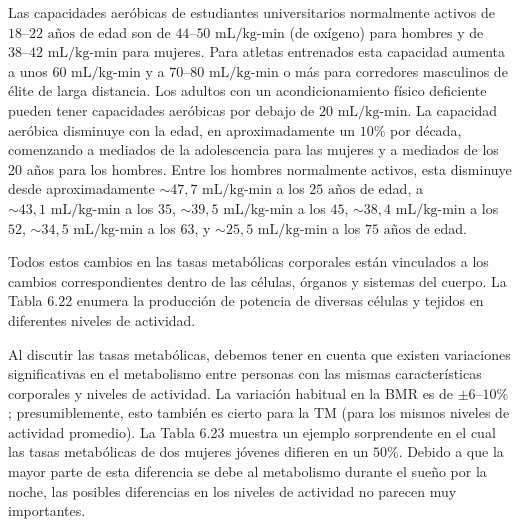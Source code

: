 \documentclass[12pt]{book}
\begin{document}
Las capacidades aeróbicas de estudiantes universitarios normalmente activos de $18\text{--}22\text{ años}$ de edad son de $44\text{--}50\text{ mL/kg-min}$ (de oxígeno) para hombres y de $38\text{--}42\text{ mL/kg-min}$ para mujeres. Para atletas entrenados esta capacidad aumenta a unos $60\text{ mL/kg-min}$ y a $70\text{--}80\text{ mL/kg-min}$ o más para corredores masculinos de élite de larga distancia. Los adultos con un acondicionamiento físico deficiente pueden tener capacidades aeróbicas por debajo de $20\text{ mL/kg-min}$. La capacidad aeróbica disminuye con la edad, en aproximadamente un $10\%$ por década, comenzando a mediados de la adolescencia para las mujeres y a mediados de los 20 años para los hombres. Entre los hombres normalmente activos, esta disminuye desde aproximadamente $\sim 47,7\text{ mL/kg-min}$ a los $25\text{ años}$ de edad, a $\sim 43,1\text{ mL/kg-min}$ a los $35$, $\sim 39,5\text{ mL/kg-min}$ a los $45$, $\sim 38,4\text{ mL/kg-min}$ a los $52$, $\sim 34,5\text{ mL/kg-min}$ a los $63$, y $\sim 25,5\text{ mL/kg-min}$ a los $75\text{ años}$ de edad.

Todos estos cambios en las tasas metabólicas corporales están vinculados a los cambios correspondientes dentro de las células, órganos y sistemas del cuerpo. La Tabla 6.22 enumera la producción de potencia de diversas células y tejidos en diferentes niveles de actividad.

Al discutir las tasas metabólicas, debemos tener en cuenta que existen variaciones significativas en el metabolismo entre personas con las mismas características corporales y niveles de actividad. La variación habitual en la BMR es de $\pm 6\text{--}10\%$; presumiblemente, esto también es cierto para la TM (para los mismos niveles de actividad promedio). La Tabla 6.23 muestra un ejemplo sorprendente en el cual las tasas metabólicas de dos mujeres jóvenes difieren en un $50\%$. Debido a que la mayor parte de esta diferencia se debe al metabolismo durante el sueño por la noche, las posibles diferencias en los niveles de actividad no parecen muy importantes.
\end{document}

